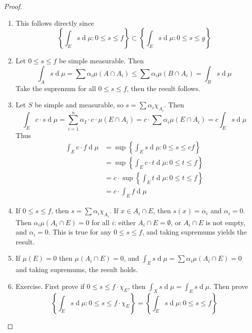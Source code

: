 \documentclass[12pt, a4paper]{book}
\renewcommand{\d}[1]{\ensuremath{\operatorname{d}\!{#1}}} %
\theoremstyle{nonumberplain}
\newtheorem{proof}{Proof}
\begin{document}
\begin{proof}
    \begin{enumerate}
        \item This follows directly since
            \begin{equation*}
                \left\{\int_E s\d{\mu}:0\leq s\leq f\right\}\subset\left\{\int_E s\d{\mu}:0\leq s\leq g\right\}
            \end{equation*}
        \item Let $0\leq s\leq f$ be simple measurable.
            Then
            \[\int_A s\d{\mu}=\sum\limits\alpha_i\mu(A\cap A_i)\leq \sum\alpha_i\mu(B\cap A_i)=\int_B s\d{\mu}\]
            Take the supremum for all $0\leq s\leq f$, then the result follows.
        \item Let $S$ be simple and measurable, so $s=\sum \alpha_i\chi_{A_i}$.
            Then
            \[\int_Ec\cdot s\d{\mu}=\sum\limits_{i=1}^n\alpha_I\cdot c\cdot \mu(E\cap A_i)=c\cdot\sum\alpha_i\mu(E\cap A_i)=c\int_Es\d{\mu}\]
            Thus
            \begin{align*}
                \int_Ec\cdot f\d{\mu}&=\sup\left\{\int_E s\d{\mu}:0\leq s\leq cf\right\}\\
                                     &=\sup\left\{\int_E c\cdot t\d{\mu}:0\leq t\leq f\right\}\\
                                     &=c\cdot\sup\left\{\int_E t\d{\mu}:0\leq t\leq f\right\}\\
                                     &= c\cdot\int_E f\d{\mu}
            \end{align*}
        \item If $0\leq s\leq f$, then $s=\sum \alpha_i\chi_{A_i}$.
            If $x\in A_i\cap E$, then $s(x)=\alpha_i$ and $\alpha_i=0$.
            Then $\alpha_i\mu(A_i\cap E)=0$ for all $i$: either $A_i\cap E=\emptyset$, or $A_i\cap E$ is not empty, and $\alpha_i=0$.
            This is true for any $0\leq s\leq f$, and taking supremums yields the result.
        \item If $\mu(E)=0$ then $\mu(A_i\cap E)=0$, and $\int_E s\d{\mu}=\sum\alpha_i\mu(A_i\cap E)=0$ and taking supremums, the result holds.
        \item Exercise.
            First prove if $0\leq s\leq f\cdot\chi_E$, then $\int_X s\d{\mu}=\int_E s\d{\mu}$.
            Then prove
            \begin{equation*}\left\{\int_E s\d{\mu}:0\leq s\leq f\cdot\chi_E\right\}=\left\{\int_E s\d{\mu}:0\leq s\leq f\right\}\end{equation*}
    \end{enumerate}
\end{proof}
\end{document}
